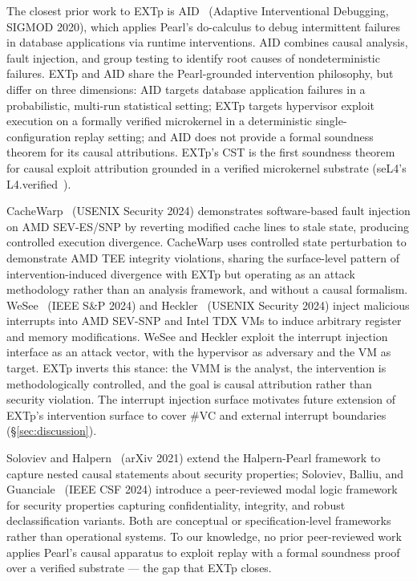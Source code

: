 \documentclass[conference]{IEEEtran}
\begin{document}
The closest prior work to EXTp is AID~\cite{fariha2020aid} (Adaptive
Interventional Debugging, SIGMOD 2020), which applies Pearl's
do-calculus to debug intermittent failures in database applications
via runtime interventions. AID combines causal analysis, fault
injection, and group testing to identify root causes of
nondeterministic failures. EXTp and AID share the Pearl-grounded
intervention philosophy, but differ on three dimensions: AID targets
database application failures in a probabilistic, multi-run
statistical setting; EXTp targets hypervisor exploit execution on a
formally verified microkernel in a deterministic single-configuration
replay setting; and AID does not provide a formal soundness theorem
for its causal attributions. EXTp's CST is the first soundness
theorem for causal exploit attribution grounded in a verified
microkernel substrate (seL4's L4.verified~\cite{klein2014sel4}).

CacheWarp~\cite{zhang2024cachewarp} (USENIX Security 2024)
demonstrates software-based fault injection on AMD SEV-ES/SNP by
reverting modified cache lines to stale state, producing controlled
execution divergence. CacheWarp uses controlled state perturbation
to demonstrate AMD TEE integrity violations, sharing the
surface-level pattern of intervention-induced divergence with EXTp
but operating as an attack methodology rather than an analysis
framework, and without a causal formalism.
WeSee~\cite{schlueter2024wesee} (IEEE S\&P 2024) and
Heckler~\cite{schlueter2024heckler} (USENIX Security 2024) inject
malicious interrupts into AMD SEV-SNP and Intel TDX VMs to induce
arbitrary register and memory modifications. WeSee and Heckler
exploit the interrupt injection interface as an attack vector, with
the hypervisor as adversary and the VM as target. EXTp inverts this
stance: the VMM is the analyst, the intervention is methodologically
controlled, and the goal is causal attribution rather than security
violation. The interrupt injection surface motivates future
extension of EXTp's intervention surface to cover \#VC and external
interrupt boundaries (\S\ref{sec:discussion}).

Soloviev and Halpern~\cite{soloviev2021nested} (arXiv 2021) extend
the Halpern-Pearl framework to capture nested causal statements
about security properties; Soloviev, Balliu, and
Guanciale~\cite{soloviev2024modal} (IEEE CSF 2024) introduce a
peer-reviewed modal logic framework for security properties
capturing confidentiality, integrity, and robust declassification
variants. Both are conceptual or specification-level frameworks
rather than operational systems. To our knowledge, no prior
peer-reviewed work applies Pearl's causal apparatus to exploit
replay with a formal soundness proof over a verified substrate ---
the gap that EXTp closes.
\end{document}
